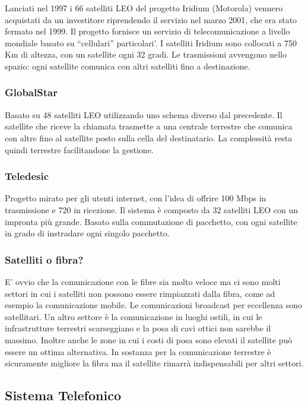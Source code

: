 Lanciati nel 1997 i 66 satelliti LEO del progetto Iridium (Motorola) vennero acquistati da un investitore riprendendo il servizio nel marzo 2001, che era stato fermato nel 1999. Il progetto fornisce un servizio di telecomunicazione a livello mondiale basato su ``cellulari'' particolari'. I satelliti Iridium sono collocati a 750 Km di altezza, con un satellite ogni 32 gradi. Le trasmissioni avvengono nello spazio: ogni satellite comunica con altri satelliti fino a destinazione.

\subsubsection*{GlobalStar}

Basato su 48 satelliti LEO utilizzando uno schema diverso dal precedente. Il satellite che riceve la chiamata trasmette a una centrale terrestre che comunica con altre fino al satellite posto sulla cella del destinatario. La complessità resta quindi terrestre facilitandone la gestione.

\subsubsection*{Teledesic}

Progetto mirato per gli utenti internet, con l'idea di offrire 100 Mbps in trasmissione e 720 in ricezione. Il sistema è composto da 32 satelliti LEO con un impronta più grande. Basato sulla commutazione di pacchetto, con ogni satellite in grado di instradare ogni singolo pacchetto.

\subsubsection{Satelliti o fibra?}

E' ovvio che la comunicazione con le fibre sia molto veloce ma ci sono molti settori in cui i satelliti non possono essere rimpiazzati dalla fibra, come ad esempio la comunicazione mobile. Le comunicazioni broadcast per eccellenza sono satellitari. Un altro settore è la comunicazione in luoghi ostili, in cui le infrastrutture terrestri scarseggiano e la posa di cavi ottici non sarebbe il massimo. Inoltre anche le zone in cui i costi di posa sono elevati il satellite può essere un ottima alternativa. In sostanza per la comunicazione terrestre è sicuramente migliore la fibra ma il satellite rimarrà indispensabili per altri settori.

\subsection{Sistema Telefonico}


